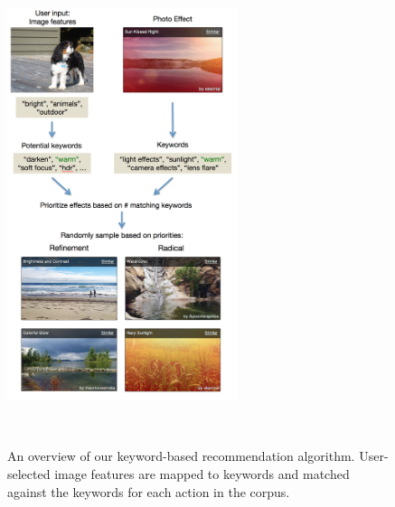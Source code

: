\begin{figure}
\centering
  \includegraphics[width=0.6\textwidth]{discoveryspace/figures/rec_alg_new.png}
  \caption{An overview of our keyword-based recommendation algorithm. User-selected image features are mapped to keywords and matched against the keywords for each action in the corpus.}~\label{fig:discoveryspace_rec_alg}
\end{figure}
